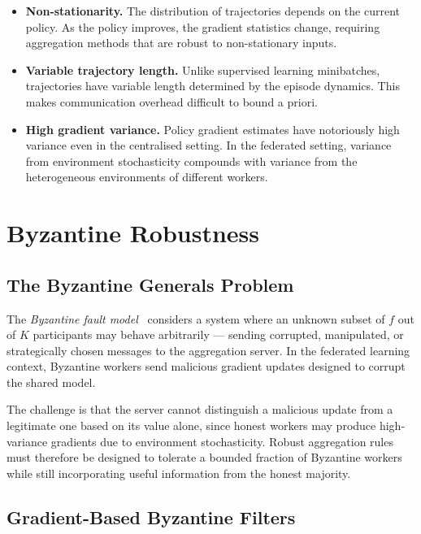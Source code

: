 \begin{itemize}
    \item \textbf{Non-stationarity.} The distribution of trajectories depends on
          the current policy. As the policy improves, the gradient statistics change,
          requiring aggregation methods that are robust to non-stationary inputs.
    \item \textbf{Variable trajectory length.} Unlike supervised learning minibatches,
          trajectories have variable length determined by the episode dynamics. This
          makes communication overhead difficult to bound a priori.
    \item \textbf{High gradient variance.} Policy gradient estimates have
          notoriously high variance even in the centralised setting. In the federated
          setting, variance from environment stochasticity compounds with variance
          from the heterogeneous environments of different workers.
\end{itemize}

\section{Byzantine Robustness}

\subsection{The Byzantine Generals Problem}

The \emph{Byzantine fault model}~\cite{lamport1982byzantine} considers a system
where an unknown subset of $f$ out of $K$ participants may behave arbitrarily ---
sending corrupted, manipulated, or strategically chosen messages to the
aggregation server. In the federated learning context, Byzantine workers send
malicious gradient updates designed to corrupt the shared model.

The challenge is that the server cannot distinguish a malicious update from a
legitimate one based on its value alone, since honest workers may produce
high-variance gradients due to environment stochasticity. Robust aggregation
rules must therefore be designed to tolerate a bounded fraction of Byzantine
workers while still incorporating useful information from the honest majority.

\subsection{Gradient-Based Byzantine Filters}

